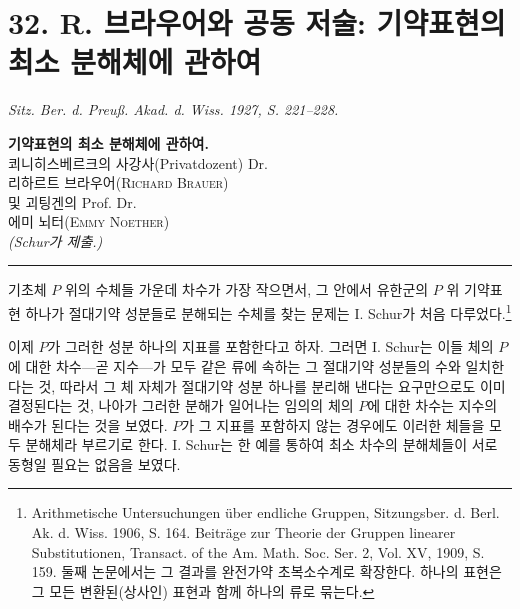 
\section*{32. R. 브라우어와 공동 저술: 기약표현의 최소 분해체에 관하여}
\emph{Sitz. Ber. d. Preuß. Akad. d. Wiss. 1927, S. 221--228.}

\begin{center}
{\Large\bfseries 기약표현의 최소 분해체에 관하여.}\\[1.0em]
쾨니히스베르크의 사강사(Privatdozent) Dr.\\
\textsc{리하르트 브라우어(Richard Brauer)}\\
및 괴팅겐의 Prof. Dr.\\
\textsc{에미 뇌터(Emmy Noether)}\\[0.8em]
\emph{(Schur가 제출.)}\\[0.5em]
\rule{4em}{0.4pt}
\end{center}

기초체 $P$ 위의 수체들 가운데 차수가 가장 작으면서, 그 안에서 유한군의 $P$ 위 기약표현 하나가 절대기약 성분들로 분해되는 수체를 찾는 문제는 I. Schur가 처음 다루었다.\footnote{Arithmetische Untersuchungen über endliche Gruppen, Sitzungsber. d. Berl. Ak. d. Wiss. 1906, S. 164. Beiträge zur Theorie der Gruppen linearer Substitutionen, Transact. of the Am. Math. Soc. Ser. 2, Vol. XV, 1909, S. 159. 둘째 논문에서는 그 결과를 완전가약 초복소수계로 확장한다. 하나의 표현은 그 모든 변환된(상사인) 표현과 함께 하나의 류로 묶는다.}

이제 $P$가 그러한 성분 하나의 지표를 포함한다고 하자. 그러면 I. Schur는 이들 체의 $P$에 대한 차수---곧 지수---가 모두 같은 류에 속하는 그 절대기약 성분들의 수와 일치한다는 것, 따라서 그 체 자체가 절대기약 성분 하나를 분리해 낸다는 요구만으로도 이미 결정된다는 것, 나아가 그러한 분해가 일어나는 임의의 체의 $P$에 대한 차수는 지수의 배수가 된다는 것을 보였다. $P$가 그 지표를 포함하지 않는 경우에도 이러한 체들을 모두 분해체라 부르기로 한다. I. Schur는 한 예를 통하여 최소 차수의 분해체들이 서로 동형일 필요는 없음을 보였다.

